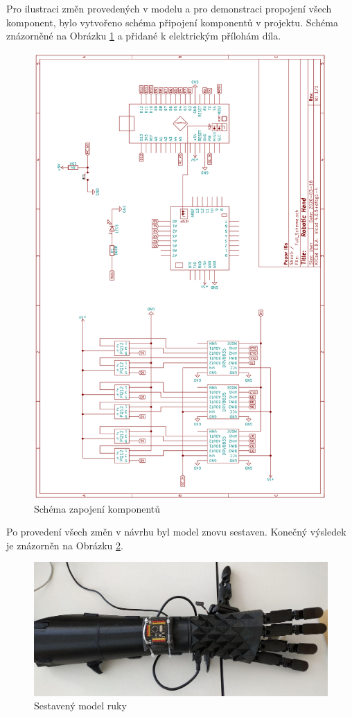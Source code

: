 \documentclass[thesis=B,czech]{FITthesis}[2012/06/26]
\begin{document}
Pro ilustraci změn provedených v modelu a pro demonstraci propojení všech komponent, bylo vytvořeno schéma připojení komponentů v projektu. Schéma znázorněné na Obrázku \ref{fig:HandScheme} a přidané k elektrickým přílohám díla.


 \begin{figure}[H]
\centering
\includegraphics[scale=0.27]{./image/HandScheme.png}
\caption{Schéma zapojení komponentů}
\label{fig:HandScheme}
\end{figure} 


Po provedení všech změn v návrhu byl model znovu sestaven. Konečný výsledek je znázorněn na Obrázku \ref{fig:finalHand}.

 \begin{figure}[h]
\centering
\includegraphics[scale=0.35]{./image/handFinal.png}
\caption{Sestavený model ruky}
\label{fig:finalHand}
\end{figure} 
\end{document}
